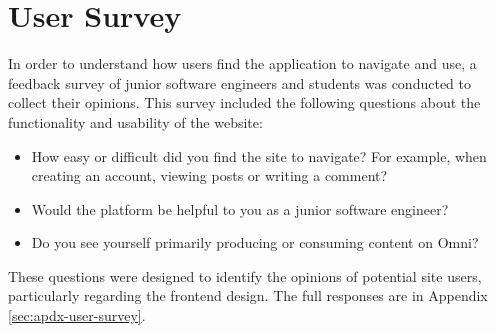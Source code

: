 \section{User Survey}
In order to understand how users find the application to navigate and use, a feedback survey of junior software engineers and students was conducted to collect their opinions.
This survey included the following questions about the functionality and usability of the website:
\begin{itemize}
    \item How easy or difficult did you find the site to navigate? For example, when creating an account, viewing posts or writing a comment?
    \item Would the platform be helpful to you as a junior software engineer?
    \item Do you see yourself primarily producing or consuming content on Omni?
\end{itemize}
These questions were designed to identify the opinions of potential site users, particularly regarding the frontend design.
The full responses are in Appendix \ref{sec:apdx-user-survey}.
